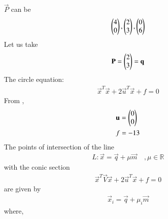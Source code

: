 \documentclass[journal,12pt,twocolumn]{IEEEtran}
\begin{document}
$\vec P$ can be
\begin{align}
    \begin{pmatrix}4\\0\end{pmatrix}, \begin{pmatrix}2\\3\end{pmatrix}, \begin{pmatrix}0\\6\end{pmatrix}
\end{align}
Let us take 
\begin{align}
    \mathbf P =\begin{pmatrix}2\\3\end{pmatrix}=\mathbf q
\end{align}
The circle equation:
\begin{align}
    \vec x^T \vec x + 2 \vec u^T\vec x +f=0
\end{align}
From \brak{\ref{eq:circle}},
\begin{align}
    &\mathbf u=\begin{pmatrix}0\\0\end{pmatrix}\\
    & f=-13
\end{align}
The points of intersection of the line
\begin{align}
    L: \vec x = \vec q + \mu \vec m \quad ,\mu \in \mathbb R
\end{align}
with the conic section
\begin{align}
    \vec x^T \vec V \vec x +2\vec u^T \vec x+ f=0
\end{align}
are given by 
\begin{align}
    \label{points of intersection}\vec x_i = \vec q + \mu _i \vec m
\end{align}
where,
\end{document}
